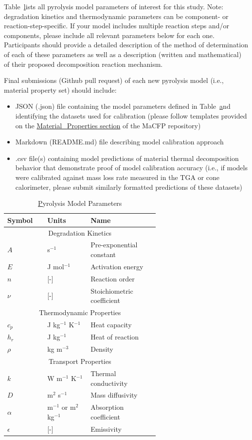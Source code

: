 \documentclass[12pt]{article}
\begin{document}
Table~\href{table:properties} lists all pyrolysis model parameters of interest for this study. Note: degradation kinetics and thermodynamic parameters can be component- or reaction-step-specific. If your model includes multiple reaction steps and/or components, please include all relevant parameters below for each one. Participants should provide a detailed description of the method of determination of each of these parameters as well as a description (written and mathematical) of their proposed decomposition reaction mechanism. 

Final submissions (Github pull request) of each new pyrolysis model (i.e., material property set) should include: 
\begin{itemize}[noitemsep]
\item JSON (.json) file containing the model parameters defined in Table~\href{table:properties} and identifying the datasets used for calibration (please follow templates provided on the \href{https://github.com/MaCFP/matl-db/tree/master/PMMA/Calibration_Data}{Material\_Properties section} of the MaCFP repository)
\item Markdown (README.md) file describing model calibration approach
\item .csv file(s) containing model predictions of material thermal decomposition behavior that demonstrate proof of model calibration accuracy (i.e., if models were calibrated against mass loss rate measured in the TGA or cone calorimeter, please submit similarly formatted predictions of these datasets)
\end{itemize}


\begin{table}[htb]
\centering
\label{table:properties}
\caption{\href{table:properties} Pyrolysis Model Parameters}
\begin{tabular}{p{0.125\linewidth} | p{0.2\linewidth}| p{0.3\linewidth}}
\hline
\textbf{Symbol}       	& \textbf{Units} & \textbf{Name}\\
\hline
\multicolumn{3}{c}{Degradation Kinetics}\\
\hline
$A$	&s$^{-1}$		&Pre-exponential constant \\
$E$	&J mol$^{-1}$	&Activation energy \\
$n$	&[-]		&Reaction order\\
$\nu$	&[-]		&Stoichiometric coefficient\\
\hline		
\multicolumn{3}{c}{Thermodynamic Properties}\\
\hline
$c_p$	&J kg$^{-1}$ K$^{-1}$	&Heat capacity\\
$h_r$	&J kg$^{-1}$		&Heat of reaction\\
$\rho$	&kg m$^{-3}$		&Density\\
\hline		
\multicolumn{3}{c}{Transport Properties}\\
\hline
$k$	&W m$^{-1}$ K$^{-1}$	&Thermal conductivity\\
$D$	&m$^2$ s$^{-1}$		&Mass diffusivity\\
$\alpha$	&m$^{-1}$ or m$^2$ kg$^{-1}$	&Absorption coefficient\\
$\epsilon$	&[-]				&Emissivity\\
\hline
\end{tabular}
\end{table}
\end{document}
